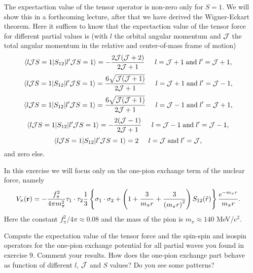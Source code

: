 \documentclass[graybox,sectrefs,envcountresetchap,open=right]{svmonodo}
\newenvironment{doconceexercise}{}{}
\begin{document}
\begin{doconceexercise}
The expectaction value of the tensor operator is non-zero only for $S=1$. We will show this in a forthcoming lecture, after that we have derived the Wigner-Eckart theorem. 
Here it suffices to know that the expectaction value of the tensor force for different partial values is  (with $l$ the orbital angular momentum and ${\cal J}$ the total angular momentum in the relative and center-of-mass frame of motion)
\[
\langle l {\cal J}S=1| S_{12} | l' {\cal J}S=1\rangle = -\frac{2{\cal J}({\cal J}+2)}{2{\cal J}+1} \hspace{0.5cm} l= {\cal J}+1 \hspace{0.1cm}\mathrm{and} \hspace{0.1cm} l'={\cal J}+1,
\]
\[
\langle l {\cal J}S=1| S_{12} | l' {\cal J}S=1\rangle = \frac{6\sqrt{{\cal J}({\cal J}+1)}}{2{\cal J}+1} \hspace{0.5cm} l= {\cal J}+1 \hspace{0.1cm}\mathrm{and} \hspace{0.1cm} l'={\cal J}-1,
\]
\[
\langle l {\cal J}S=1| S_{12} | l' {\cal J}S=1\rangle = \frac{6\sqrt{{\cal J}({\cal J}+1)}}{2{\cal J}+1} \hspace{0.5cm} l= {\cal J}-1 \hspace{0.1cm}\mathrm{and} \hspace{0.1cm} l'={\cal J}+1,
\]
\[
\langle l {\cal J}S=1| S_{12} | l' {\cal J}S=1\rangle = -\frac{2({\cal J}-1)}{2{\cal J}+1} \hspace{0.5cm} l= {\cal J}-1 \hspace{0.1cm}\mathrm{and} \hspace{0.1cm} l'={\cal J}-1,
\]
\[
\langle l {\cal J}S=1| S_{12} | l' {\cal J}S=1\rangle = 2 \hspace{0.5cm} l= {\cal J} \hspace{0.1cm}\mathrm{and} \hspace{0.1cm} l'={\cal J},
\]
and zero else.   

In this exercise we will focus only on the one-pion exchange term of the nuclear force, namely
\[
V_{\pi}(\mathbf{r})= -\frac{f_{\pi}^{2}}{4\pi m_{\pi}^{2}}\mathbf{ \tau}_1\cdot\mathbf{\tau}_2
\frac{1}{3}\left\{\mathbf{ \sigma}_1\cdot\mathbf{ \sigma}_2+\left( 1 + {3\over m_\pi r} + {3\over\left(m_\pi r\right)^2}\right) S_{12} (\hat r)\right\} \frac{e^{-m_\pi r}}{m_\pi r}.
\]
Here the constant $f_{\pi}^{2}/4\pi\approx 0.08$ and the mass of the pion is $m_\pi\approx 140$ MeV/c${}^{2}$.


Compute the expectation value of the tensor force and the spin-spin  and isospin operators for the one-pion exchange potential for all partial waves you found in exercise 9. Comment your results. How does the one-pion exchange part behave as function of different $l$, ${\cal J}$ and $S$ values? Do you see some patterns?


\end{doconceexercise}
\end{document}
